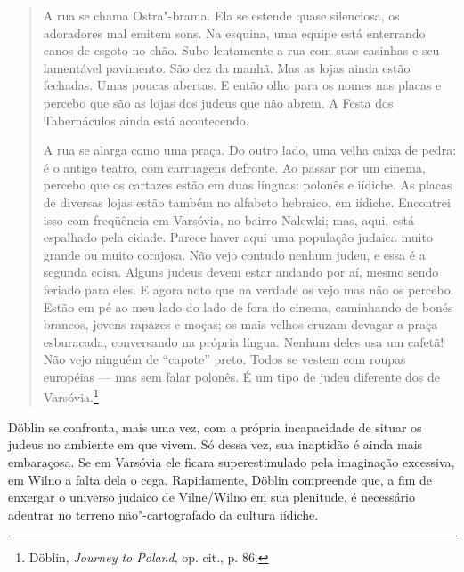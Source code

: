 \begin{quote}
A rua se chama Ostra"-brama. Ela se estende quase silenciosa, os
adoradores mal emitem sons. Na esquina, uma equipe está enterrando canos
de esgoto no chão. Subo lentamente a rua com suas casinhas e seu
lamentável pavimento. São dez da manhã. Mas as lojas ainda estão
fechadas. Umas poucas abertas. E então olho para os nomes nas placas e
percebo que são as lojas dos judeus que não abrem. A Festa dos
Tabernáculos ainda está acontecendo.

A rua se alarga como uma praça. Do outro lado, uma velha caixa de pedra:
é o antigo teatro, com carruagens defronte. Ao passar por um cinema,
percebo que os cartazes estão em duas línguas: polonês e iídiche. As
placas de diversas lojas estão também no alfabeto hebraico, em iídiche.
Encontrei isso com freqüência em Varsóvia, no bairro Nalewki; mas, aqui,
está espalhado pela cidade. Parece haver aqui uma população judaica
muito grande ou muito corajosa. Não vejo contudo nenhum judeu, e essa é
a segunda coisa. Alguns judeus devem estar andando por aí, mesmo sendo
feriado para eles. E agora noto que na verdade os vejo mas não os
percebo. Estão em pé ao meu lado do lado de fora do cinema, caminhando
de bonés brancos, jovens rapazes e moças; os mais velhos cruzam devagar
a praça esburacada, conversando na própria língua. Nenhum deles usa um
cafetã! Não vejo ninguém de ``capote'' preto. Todos se vestem com roupas
européias --- mas sem falar polonês. É um tipo de judeu diferente dos de
Varsóvia.\footnote{Döblin, \emph{Journey to Poland}, op. cit., p. 86.}
\end{quote}

Döblin se confronta, mais uma vez, com a própria incapacidade de situar
os judeus no ambiente em que vivem. Só dessa vez, sua inaptidão é ainda
mais embaraçosa. Se em Varsóvia ele ficara superestimulado pela
imaginação excessiva, em Wilno a falta dela o cega. Rapidamente, Döblin
compreende que, a fim de enxergar o universo judaico de Vilne/Wilno em
sua plenitude, é necessário adentrar no terreno não"-cartografado da
cultura iídiche.

\asterisc

